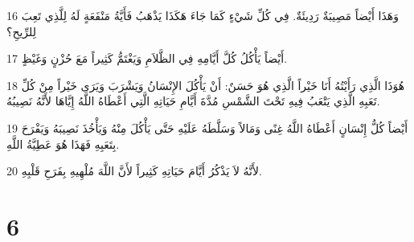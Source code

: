 \par 16 وَهَذَا أَيْضاً مَصِيبَةٌ رَدِيئَةٌ. فِي كُلِّ شَيْءٍ كَمَا جَاءَ هَكَذَا يَذْهَبُ فَأَيَّةُ مَنْفَعَةٍ لَهُ لِلَّذِي تَعِبَ لِلرِّيحِ؟
\par 17 أَيْضاً يَأْكُلُ كُلَّ أَيَّامِهِ فِي الظَّلاَمِ وَيَغْتَمُّ كَثِيراً مَعَ حُزْنٍ وَغَيْظٍ.
\par 18 هُوَذَا الَّذِي رَأَيْتُهُ أَنَا خَيْراً الَّذِي هُوَ حَسَنٌ: أَنْ يَأْكُلَ الإِنْسَانُ وَيَشْرَبَ وَيَرَى خَيْراً مِنْ كُلِّ تَعَبِهِ الَّذِي يَتْعَبُ فِيهِ تَحْتَ الشَّمْسِ مُدَّةَ أَيَّامِ حَيَاتِهِ الَّتِي أَعْطَاهُ اللَّهُ إِيَّاهَا لأَنَّهُ نَصِيبُهُ.
\par 19 أَيْضاً كُلُّ إِنْسَانٍ أَعْطَاهُ اللَّهُ غِنًى وَمَالاً وَسَلَّطَهُ عَلَيْهِ حَتَّى يَأْكُلَ مِنْهُ وَيَأْخُذَ نَصِيبَهُ وَيَفْرَحَ بِتَعَبِهِ فَهَذَا هُوَ عَطِيَّةُ اللَّهِ.
\par 20 لأَنَّهُ لاَ يَذْكُرُ أَيَّامَ حَيَاتِهِ كَثِيراً لأَنَّ اللَّهَ مُلْهِيهِ بِفَرَحِ قَلْبِهِ.

\chapter{6}

